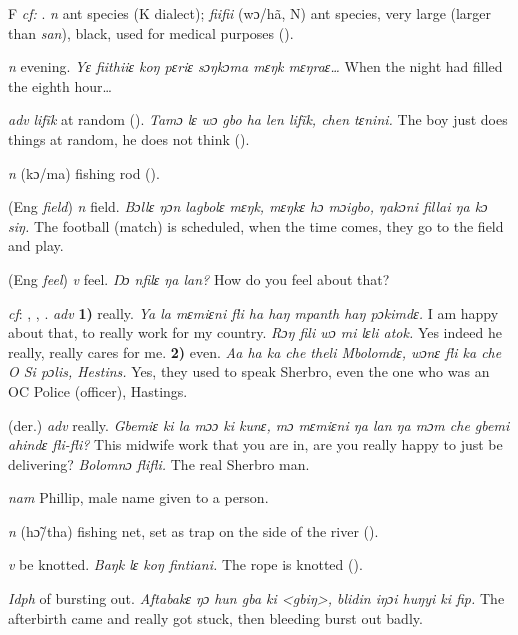 \begin{letter}{F}
 \textit{cf:} . \textit{n} ant species (K dialect); \textit{fiifii} (wɔ/hã, N) ant species, very large (larger than \textit{san}), black, used for medical purposes (\citealt{Pichl1967}).

 \textit{n} evening. \textit{Yɛ fiithiiɛ koŋ pɛriɛ sɔŋkɔma mɛŋk mɛŋraɛ…} When the night had filled the eighth hour…

 \textit{adv} \textit{lifĩk} at random (\citealt{Pichl1967}). \textit{Tamɔ lɛ wɔ gbo ha len lifĩk, chen tɛnini.} The boy just does things at random, he does not think (\citealt{Pichl1967}). 

 \textit{n} (kɔ/ma) fishing rod (\citealt{Pichl1967}).

 (Eng \textit{field}) \textit{n} field. \textit{Bɔllɛ ŋɔn lagbolɛ mɛŋk, mɛŋkɛ hɔ mɔigbo, ŋakɔni fillai ŋa kɔ siŋ.} The football (match) is scheduled, when the time comes, they go to the field and play.

 (Eng \textit{feel}) \textit{v} feel. \textit{Ŋɔ nfilɛ ŋa lan?} How do you feel about that?

 \textit{cf}: , , . \textit{adv} \textbf{1)} really. \textit{Ya la mɛmiɛni fli ha haŋ mpanth haŋ pɔkimdɛ.} I am happy about that, to really work for my country. \textit{Rɔŋ fili wɔ mi lɛli atok.} Yes indeed he really, really cares for me. \textbf{2)} even. \textit{Aa ha ka che theli Mbolomdɛ, wɔnɛ fli ka che O Si pɔlis, Hestins.} Yes, they used to speak Sherbro, even the one who was an OC Police (officer), Hastings.

 (der.) \textit{adv} really. \textit{Gbemiɛ ki la mɔɔ ki kunɛ, mɔ mɛmiɛni ŋa lan ŋa mɔm che gbemi ahindɛ fli-fli?} This midwife work that you are in, are you really happy to just be delivering? \textit{Bolomnɔ flifli.} The real Sherbro man.

 \textit{nam} Phillip, male name given to a person.

 \textit{n} (hɔ̃/tha) fishing net, set as trap on the side of the river (\citealt{Pichl1967}).

 \textit{v} be knotted. \textit{Baŋk lɛ koŋ fintiani.} The rope is knotted (\citealt{Pichl1967}). 

 \textit{Idph} of bursting out. \textit{Aftabakɛ ŋɔ hun gba ki <gbiŋ>, blidin iŋɔi huŋyi ki fip.} The afterbirth came and really got stuck, then bleeding burst out badly.


\end{letter}
